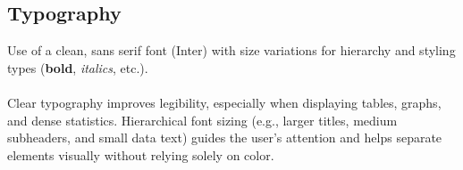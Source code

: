 \subsection{Typography}

Use of a clean, sans serif font (Inter) with size variations for hierarchy and styling types (\textbf{bold}, \textit{italics}, etc.).
\\
\\
Clear typography improves legibility, especially when displaying tables, graphs, and dense statistics. Hierarchical font sizing (e.g., larger titles, medium subheaders, and small data text) guides the user's attention and helps separate elements visually without relying solely on color.
